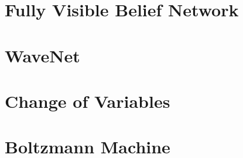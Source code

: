 %

	\section{Fully Visible Belief Network} %

	\section{WaveNet} %

	\section{Change of Variables} %

	\section{Boltzmann Machine} %

